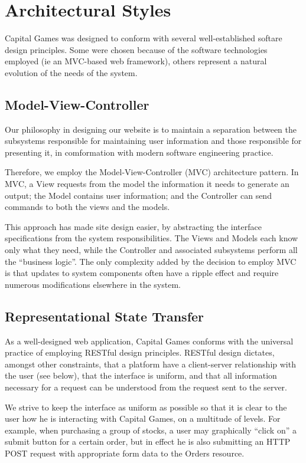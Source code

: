 \section{Architectural Styles}

Capital Games was designed to conform with several well-established
softare design principles. 
Some were chosen because of the software technologies
employed (ie an MVC-based web framework), others 
represent a natural evolution of the needs of the 
system. 

\subsection{Model-View-Controller}

Our philosophy in designing our website is to maintain
a separation between the subsystems responsible for 
maintaining user information and those responsible
for presenting it, in comformation with modern software
engineering practice. 

Therefore, we employ the Model-View-Controller (MVC)
architecture pattern. In MVC, a View requests from the
model the information it needs to generate an output;
the Model contains user information; and the Controller
can send commands to both the views and the models. \cite{wiki:mvc} 

This approach has made site design easier,
by abstracting the interface specifications from the 
system responsibilities. The Views and Models each know 
only what they need, while the Controller and associated
subsystems perform all the ``business logic''. The only
complexity added by the decision to employ MVC is that
updates to system components often have a ripple effect
and require numerous modifications elsewhere in the system.

\subsection{Representational State Transfer}

As a well-designed web application, Capital Games 
conforms with the universal practice of employing
RESTful design principles. RESTful design dictates,
amongst other constraints, that a platform have a
client-server relationship with the user (see below),
that the interface is uniform, and that all information
necessary for a request can be understood from the
request sent to the server. \cite{wiki:restful} 

We strive to keep the interface as uniform as possible
so that it is clear to the user how he is interacting
with Capital Games, on a multitude of levels. For example,
when purchasing a group of stocks, a user may graphically
``click on'' a submit button for a certain order, but
in effect he is also submitting an HTTP POST request with
appropriate form data to the Orders resource. 

